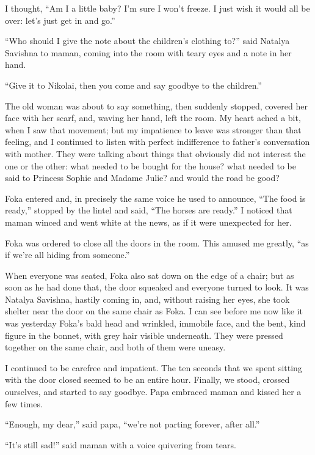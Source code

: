 I thought, ``Am I a little baby? I'm sure I won't freeze. I just wish it would all be over: let's just get in and go.'' %

``Who should I give the note about the children's clothing to?'' said Natalya Savishna to maman, coming into the room with teary eyes and a note in her hand. %

``Give it to Nikolai, then you come and say goodbye to the children.''

The old woman was about to say something, then suddenly stopped, covered her face with her scarf, and, waving her hand, left the room. My heart ached a bit, when I saw that movement; but my impatience to leave was stronger than that feeling, and I continued to listen with perfect indifference to father's conversation with mother. They were talking about things that obviously did not interest the one or the other: what needed to be bought for the house? what needed to be said to Princess Sophie and Madame Julie? and would the road be good?

Foka entered and, in precisely the same voice he used to announce, ``The food is ready,'' stopped by the lintel and said, ``The horses are ready.'' I noticed that maman winced and went white at the news, as if it were unexpected for her.

Foka was ordered to close all the doors in the room. This amused me greatly, ``as if we're all hiding from someone.''

When everyone was seated, Foka also sat down on the edge of a chair; but as soon as he had done that, the door squeaked and everyone turned to look. It was Natalya Savishna, hastily coming in, and, without raising her eyes, she took shelter near the door on the same chair as Foka. I can see before me now like it was yesterday Foka's bald head and wrinkled, immobile face, and the bent, kind figure in the bonnet, with grey hair visible underneath. They were pressed together on the same chair, and both of them were uneasy.

I continued to be carefree and impatient. The ten seconds that we spent sitting with the door closed seemed to be an entire hour. Finally, we stood, crossed ourselves, and started to say goodbye. Papa embraced maman and kissed her a few times.

``Enough, my dear,'' said papa, ``we're not parting forever, after all.'' %

``It's still sad!'' said maman with a voice quivering from tears. %

